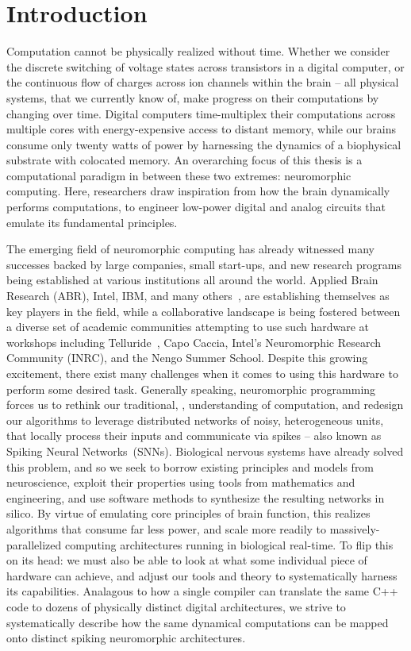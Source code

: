 \chapter{Introduction}

Computation cannot be physically realized without time.
Whether we consider the discrete switching of voltage states across transistors in a
digital computer,
or the continuous flow of charges across ion channels within the brain -- 
all physical systems, that we currently know of, make progress on their computations
by changing over time.
Digital computers time-multiplex their computations across multiple cores with energy-expensive access to distant memory, while our brains consume only twenty watts of power by harnessing the dynamics of a biophysical substrate with colocated memory.
An overarching focus of this thesis is a computational paradigm
in between these two extremes: neuromorphic computing.
Here, researchers draw inspiration from how the
brain dynamically performs computations,
to engineer low-power digital and analog circuits that emulate its fundamental principles.

The emerging field of neuromorphic computing has already
witnessed many successes backed by large companies, small start-ups, and new research
programs being established at various institutions all around the world.
Applied Brain Research (ABR), Intel, IBM, and many others~\citep{marketreport2018}, are establishing themselves as key players in the field, while a collaborative landscape is being fostered between a diverse set of academic communities attempting to use such hardware at workshops including Telluride~\citep{cohen2001report}, Capo Caccia, Intel's Neuromorphic Research Community (INRC), and the Nengo Summer School.
Despite this growing excitement, there exist many challenges when it comes to using
this hardware to perform some desired task.
Generally speaking, neuromorphic programming forces us to rethink our traditional,
\citet{von1958}, understanding of computation, and redesign our algorithms to leverage distributed networks of noisy, heterogeneous units, that locally process their inputs and communicate via spikes -- also known as Spiking Neural Networks~(SNNs).
Biological nervous systems have already solved this problem, and so we seek to borrow existing
principles and models from neuroscience, exploit their properties using tools from mathematics and engineering,
and use software methods to synthesize the resulting networks in silico.
By virtue of emulating core principles of brain function, this realizes algorithms that consume far less power, and scale more readily to massively-parallelized computing architectures running in biological real-time.
To flip this on its head: we must also be able to look at what some individual piece of hardware can achieve,
and adjust our tools and theory to systematically harness its capabilities.
Analagous to how a single compiler can translate the same C++ code
to dozens of physically distinct digital architectures, we strive to systematically describe
how the same dynamical computations can be mapped onto distinct spiking neuromorphic architectures.

